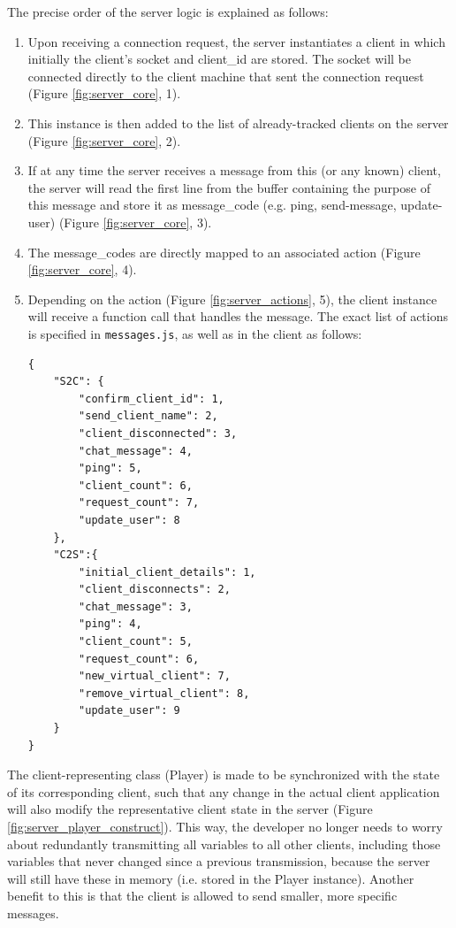 \documentclass[bsc, 12pt, twoside, singlespacing, parskip, abbrevs, notimes, normalheadings, logo, deptreport]{styles/infthesis}
\begin{document}
\vspace{2em}
The precise order of the server logic is explained as follows:
\begin{enumerate}
\item Upon receiving a connection request, the server instantiates a client in which initially the client's socket and client\_id are stored. The socket will be connected directly to the client machine that sent the connection request (Figure \ref{fig:server_core}, 1).\\
\item This instance is then added to the list of already-tracked clients on the server (Figure \ref{fig:server_core}, 2).
\item If at any time the server receives a message from this (or any known) client, the server will read the first line from the buffer containing the purpose of this message and store it as message\_code (e.g. ping, send-message, update-user) (Figure \ref{fig:server_core}, 3).
\item The message\_codes are directly mapped to an associated action (Figure \ref{fig:server_core}, 4).
\item Depending on the action (Figure \ref{fig:server_actions}, 5), the client instance will receive a function call that handles the message. The exact list of actions is specified in \texttt{messages.js}, as well as in the client as follows:
\begin{verbatim}
{
	"S2C": {
		"confirm_client_id": 1,
		"send_client_name": 2,
		"client_disconnected": 3,
		"chat_message": 4,
		"ping": 5,
		"client_count": 6,
		"request_count": 7,
		"update_user": 8
	},
	"C2S":{
		"initial_client_details": 1,
		"client_disconnects": 2,
		"chat_message": 3,
		"ping": 4,
		"client_count": 5,
		"request_count": 6,
		"new_virtual_client": 7,
		"remove_virtual_client": 8,
		"update_user": 9
	}
}
\end{verbatim}

\end{enumerate}



The client-representing class (Player) is made to be synchronized with the state of its corresponding client, such that any change in the actual client application will also modify the representative client state in the server (Figure \ref{fig:server_player_construct}). This way, the developer no longer needs to worry about redundantly transmitting all variables to all other clients, including those variables that never changed since a previous transmission, because the server will still have these in memory (i.e. stored in the Player instance). Another benefit to this is that the client is allowed to send smaller, more specific messages.
\end{document}
